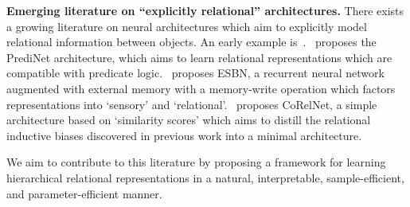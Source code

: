 \textbf{Emerging literature on ``explicitly relational'' architectures.} There exists a growing literature on neural architectures which aim to explicitly model relational information between objects. An early example is~\citep{santoroSimpleNeural2017}.~\citet{shanahanExplicitlyRelationalNeural} proposes the PrediNet architecture, which aims to learn relational representations which are compatible with predicate logic.~\citet{webbEmergentSymbols2021} proposes ESBN, a recurrent neural network augmented with external memory with a memory-write operation which factors representations into `sensory' and `relational'.~\citet{kergNeuralArchitecture2022} proposes CoRelNet, a simple architecture based on `similarity scores' which aims to distill the relational inductive biases discovered in previous work into a minimal architecture. %

We aim to contribute to this literature by proposing a framework for learning hierarchical relational representations in a natural, interpretable, sample-efficient, and parameter-efficient manner.